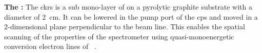 {\par\textbf{The :} The \gls{ckrs} is a sub mono-layer of \kryptonEightyThree{} on a pyrolytic graphite substrate with a diameter of \SI{2}{cm}. It can be lowered in the pump port of the \gls{cps} and moved in a 2-dimensional plane perpendicular to the beam line. This enables the spatial scanning of the properties of the spectrometer using quasi-monoenergetic conversion electron lines of \kryptonEightyThree~\cite{Bauer2014, Dyba2019}.}
